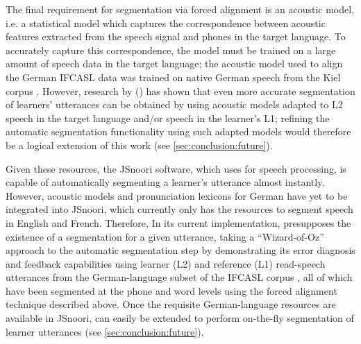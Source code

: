 	The final requirement for segmentation via forced alignment is an acoustic model, i.e. a statistical model 
	which captures the correspondence between acoustic features extracted from the speech signal and phones in the target language. 
	To accurately capture this correspondence, the model must be trained on a large amount of speech data in the target language; 
	the acoustic model used to align the German IFCASL data was trained on native German speech from the Kiel corpus \citep{Kohler1996}.
	However, research by \citeauthor{Bouselmi2005} (\citeyear{Bouselmi2005,Bouselmi2012}) has shown that even more accurate segmentation of learners' utterances can be obtained by using acoustic models adapted to L2 speech in the target language and/or speech in the learner's L1; refining the automatic segmentation functionality using such adapted models would therefore be a logical extension of this work (see \cref{sec:conclusion:future}). %
	

	
	Given these resources, the JSnoori software,
	which  uses for speech processing,
	is capable of automatically segmenting a learner's utterance almost instantly. 
	However, acoustic models and pronunciation lexicons for German have yet to be integrated into JSnoori, which 
	currently only has the resources to segment 
	speech in English and French.
	 Therefore,
	 In its current implementation, 
	 presupposes the existence of a segmentation for a given utterance,
	taking a ``Wizard-of-Oz'' approach to the automatic segmentation step by demonstrating its error diagnosis and feedback capabilities using learner (L2) and reference (L1) read-speech utterances from the German-language subset of the IFCASL corpus \citep{Fauth2014,Trouvain2013}, all of which have been segmented at the phone and word levels using the forced alignment technique described above.
	Once the requisite German-language resources are available in JSnoori,  can easily be extended to perform on-the-fly segmentation of learner utterances (see \cref{sec:conclusion:future}).
	
